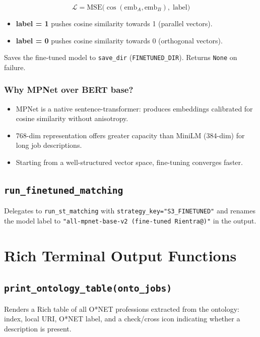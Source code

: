﻿\documentclass[12pt,a4paper]{article}
\begin{document}
\begin{equation}
  \mathcal{L} = \text{MSE}\bigl(\cos(\text{emb}_A, \text{emb}_B),\; \text{label}\bigr)
\end{equation}

\begin{itemize}[noitemsep]
  \item \textbf{label = 1} pushes cosine similarity towards 1 (parallel vectors).
  \item \textbf{label = 0} pushes cosine similarity towards 0 (orthogonal vectors).
\end{itemize}

Saves the fine-tuned model to \texttt{save\_dir} (\texttt{FINETUNED\_DIR}). Returns \texttt{None} on failure.

\subsubsection*{Why MPNet over BERT base?}

\begin{itemize}[noitemsep]
  \item MPNet is a native sentence-transformer: produces embeddings calibrated for cosine similarity without anisotropy.
  \item 768-dim representation offers greater capacity than MiniLM (384-dim) for long job descriptions.
  \item Starting from a well-structured vector space, fine-tuning converges faster.
\end{itemize}

\subsection{\texttt{run\_finetuned\_matching}}
Delegates to \texttt{run\_st\_matching} with \texttt{strategy\_key="S3\_FINETUNED"} and renames the model label to \texttt{"all-mpnet-base-v2 (fine-tuned Rientra@)"} in the output.

\clearpage
\section{Rich Terminal Output Functions}

\subsection{\texttt{print\_ontology\_table(onto\_jobs)}}
Renders a Rich table of all O*NET professions extracted from the ontology: index, local URI, O*NET label, and a check/cross icon indicating whether a description is present.
\end{document}
